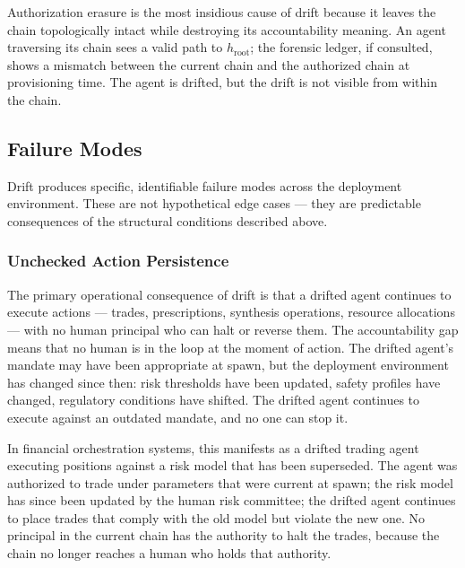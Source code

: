 Authorization erasure is the most insidious cause of drift because it leaves the chain topologically intact while destroying its accountability meaning. An agent traversing its chain sees a valid path to $h_{\text{root}}$; the forensic ledger, if consulted, shows a mismatch between the current chain and the authorized chain at provisioning time. The agent is drifted, but the drift is not visible from within the chain.

\subsection{Failure Modes}
\label{sec:drift-failure-modes}

Drift produces specific, identifiable failure modes across the deployment environment. These are not hypothetical edge cases — they are predictable consequences of the structural conditions described above.

\subsubsection{Unchecked Action Persistence}
\label{sec:unchecked-action-persistence}

The primary operational consequence of drift is that a drifted agent continues to execute actions — trades, prescriptions, synthesis operations, resource allocations — with no human principal who can halt or reverse them. The accountability gap means that no human is in the loop at the moment of action. The drifted agent's mandate may have been appropriate at spawn, but the deployment environment has changed since then: risk thresholds have been updated, safety profiles have changed, regulatory conditions have shifted. The drifted agent continues to execute against an outdated mandate, and no one can stop it.

In financial orchestration systems, this manifests as a drifted trading agent executing positions against a risk model that has been superseded. The agent was authorized to trade under parameters that were current at spawn; the risk model has since been updated by the human risk committee; the drifted agent continues to place trades that comply with the old model but violate the new one. No principal in the current chain has the authority to halt the trades, because the chain no longer reaches a human who holds that authority.


